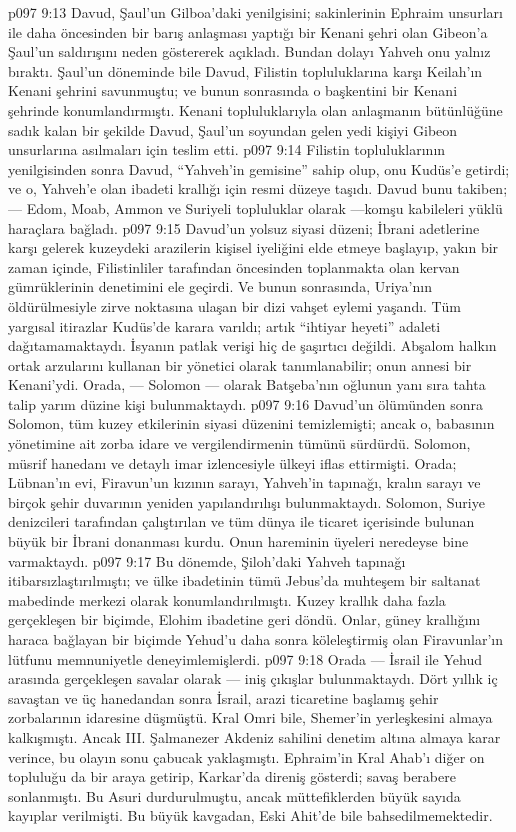 \vs p097 9:13 Davud, Şaul’un Gilboa’daki yenilgisini; sakinlerinin Ephraim unsurları ile daha öncesinden bir barış anlaşması yaptığı bir Kenani şehri olan Gibeon’a Şaul’un saldırışını neden göstererek açıkladı. Bundan dolayı Yahveh onu yalnız bıraktı. Şaul’un döneminde bile Davud, Filistin topluluklarına karşı Keilah’ın Kenani şehrini savunmuştu; ve bunun sonrasında o başkentini bir Kenani şehrinde konumlandırmıştı. Kenani topluluklarıyla olan anlaşmanın bütünlüğüne sadık kalan bir şekilde Davud, Şaul’un soyundan gelen yedi kişiyi Gibeon unsurlarına asılmaları için teslim etti.
\vs p097 9:14 Filistin topluluklarının yenilgisinden sonra Davud, “Yahveh’in gemisine” sahip olup, onu Kudüs’e getirdi; ve o, Yahveh’e olan ibadeti krallığı için resmi düzeye taşıdı. Davud bunu takiben; --- Edom, Moab, Ammon ve Suriyeli topluluklar olarak ---komşu kabileleri yüklü haraçlara bağladı.
\vs p097 9:15 Davud’un yolsuz siyasi düzeni; İbrani adetlerine karşı gelerek kuzeydeki arazilerin kişisel iyeliğini elde etmeye başlayıp, yakın bir zaman içinde, Filistinliler tarafından öncesinden toplanmakta olan kervan gümrüklerinin denetimini ele geçirdi. Ve bunun sonrasında, Uriya’nın öldürülmesiyle zirve noktasına ulaşan bir dizi vahşet eylemi yaşandı. Tüm yargısal itirazlar Kudüs’de karara varıldı; artık “ihtiyar heyeti” adaleti dağıtamamaktaydı. İsyanın patlak verişi hiç de şaşırtıcı değildi. Abşalom halkın ortak arzularını kullanan bir yönetici olarak tanımlanabilir; onun annesi bir Kenani’ydi. Orada, --- Solomon --- olarak Batşeba’nın oğlunun yanı sıra tahta talip yarım düzine kişi bulunmaktaydı.
\vs p097 9:16 Davud’un ölümünden sonra Solomon, tüm kuzey etkilerinin siyasi düzenini temizlemişti; ancak o, babasının yönetimine ait zorba idare ve vergilendirmenin tümünü sürdürdü. Solomon, müsrif hanedanı ve detaylı imar izlencesiyle ülkeyi iflas ettirmişti. Orada; Lübnan’ın evi, Firavun’un kızının sarayı, Yahveh’in tapınağı, kralın sarayı ve birçok şehir duvarının yeniden yapılandırılışı bulunmaktaydı. Solomon, Suriye denizcileri tarafından çalıştırılan ve tüm dünya ile ticaret içerisinde bulunan büyük bir İbrani donanması kurdu. Onun hareminin üyeleri neredeyse bine varmaktaydı.
\vs p097 9:17 Bu dönemde, Şiloh’daki Yahveh tapınağı itibarsızlaştırılmıştı; ve ülke ibadetinin tümü Jebus’da muhteşem bir saltanat mabedinde merkezi olarak konumlandırılmıştı. Kuzey krallık daha fazla gerçekleşen bir biçimde, Elohim ibadetine geri döndü. Onlar, güney krallığını haraca bağlayan bir biçimde Yehud’u daha sonra köleleştirmiş olan Firavunlar’ın lütfunu memnuniyetle deneyimlemişlerdi.
\vs p097 9:18 Orada --- İsrail ile Yehud arasında gerçekleşen savalar olarak --- iniş çıkışlar bulunmaktaydı. Dört yıllık iç savaştan ve üç hanedandan sonra İsrail, arazi ticaretine başlamış şehir zorbalarının idaresine düşmüştü. Kral Omri bile, Shemer’in yerleşkesini almaya kalkışmıştı. Ancak III. Şalmanezer Akdeniz sahilini denetim altına almaya karar verince, bu olayın sonu çabucak yaklaşmıştı. Ephraim’in Kral Ahab’ı diğer on topluluğu da bir araya getirip, Karkar’da direniş gösterdi; savaş berabere sonlanmıştı. Bu Asuri durdurulmuştu, ancak müttefiklerden büyük sayıda kayıplar verilmişti. Bu büyük kavgadan, Eski Ahit’de bile bahsedilmemektedir.
